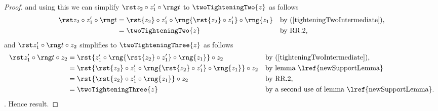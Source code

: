 {\begin{proof}
and using this we can simplify
$\longTighteningTwo$  to $\twoTighteningTwo{z}$ as follows
\begin{align*}
\longTighteningTwo 
    &= \rst{z_2} \circ z'_1 \circ \rng{\rst{z_2} \circ z'_1} \circ \rng{z_1}
                   && \mbox{by (\ref{tighteningTwoIntermediate}),}\\
    &= \twoTighteningTwo{z}
                   && \mbox{by RR.2,}
\end{align*}
and  $\longTighteningThree$ simplifies to $\twoTighteningThree{z}$ as follows
\begin{align*}
\longTighteningThree 
     &= \rst{z'_1 \circ \rng{\rst{z_2} \circ z'_1} \circ\rng{z_1}} \circ z_2
     && \mbox{by (\ref{tighteningTwoIntermediate}),}\\
     &= \rst{\rst{z_2} \circ z'_1 \circ \rng{\rst{z_2} \circ z'_1} \circ\rng{z_1}
      } \circ z_2
     && \mbox{by  lemma \lref{newSupportLemma}}\\
     &= \rst{\rst{z_2} \circ z'_1 \circ\rng{z_1}} \circ z_2 
     && \mbox {by RR.2,}\\ 
     &= \twoTighteningThree{z}
     && \mbox{by a second use of lemma \lref{newSupportLemma}.}
\end{align*}. 
Hence result.
\end{proof}

}
